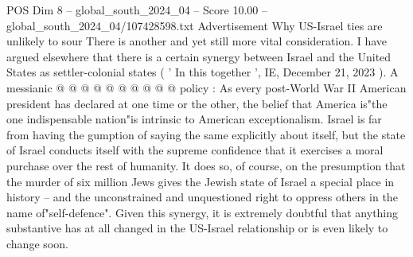 \begin{textsample}{POS Dim 8 – global\_south\_2024\_04 – Score 10.00 – global\_south\_2024\_04/107428598.txt}
Advertisement Why US-Israel ties are unlikely to sour There is another and yet still more vital consideration.
I have argued elsewhere that there is a certain synergy between Israel and the United States as settler-colonial states ( ' In this together ', IE, December 21, 2023 ).
A messianic @ @ @ @ @ @ @ @ @ @ policy : As every post-World War II American president has declared at one time or the other, the belief that America is"the one indispensable nation"is intrinsic to American exceptionalism.
Israel is far from having the gumption of saying the same explicitly about itself, but the state of Israel conducts itself with the supreme confidence that it exercises a moral purchase over the rest of humanity.
It does so, of course, on the presumption that the murder of six million Jews gives the Jewish state of Israel a special place in history -- and the unconstrained and unquestioned right to oppress others in the name of"self-defence".
Given this synergy, it is extremely doubtful that anything substantive has at all changed in the US-Israel relationship or is even likely to change soon.

\end{textsample}

